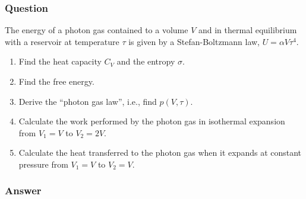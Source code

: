 \subsubsection{Question}
The energy of a photon gas contained to a volume $V$ and in thermal equilibrium with a reservoir at temperature $\tau$ is given by a Stefan-Boltzmann law, $U = \alpha V\tau^4$.
\begin{enumerate}
	\item Find the heat capacity $C_V$ and the entropy $\sigma$.
	\item Find the free energy.
	\item Derive the ``photon gas law'', i.e., find $p(V,\tau)$.
	\item Calculate the work performed by the photon gas in isothermal expansion from $V_1=V$ to $V_2=2V$.
	\item Calculate the heat transferred to the photon gas when it expands at constant pressure from $V_1 =V$ to $V_2=V$.
\end{enumerate}
\subsubsection{Answer}


